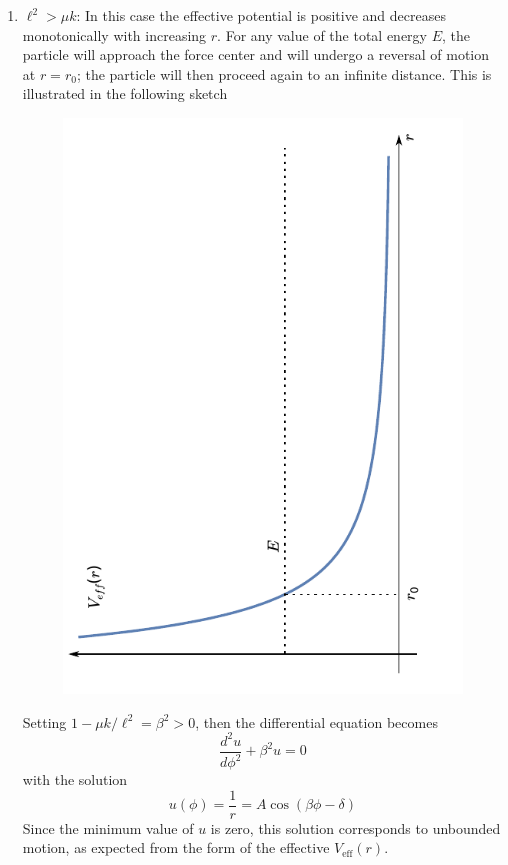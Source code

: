 \documentclass[usletter, 12pt]{article}
\begin{document}
\begin{enumerate}[leftmargin=0em, label=\textbf{\arabic*}.]
\begin{enumerate}[leftmargin=2em, label=(\textbf{\alph*})]
  \item $\ell^2>\mu k$:
    \noindent In this case the effective potential is positive and decreases
    monotonically with increasing $r$. For any value of the total energy $E$, the
    particle will approach the force center and will undergo a reversal of
    motion at $r=r_0$; the particle will then proceed again to an infinite
    distance. This is illustrated in the following sketch
    \begin{figure}[!hbt]
      \centering
      \includegraphics[width=0.7\columnwidth, angle=-90]{effective_potential_1.pdf}
    \end{figure}

    Setting $1-\mu k/\ell^2 = \beta^2 > 0$, then the differential equation
    becomes
    \begin{equation}
      \frac{d^2u}{d\phi^2}+\beta^2u = 0
    \end{equation}
    with the solution
    \begin{equation}
      u(\phi) = \frac{1}{r} = A\cos\left(\beta\phi -\delta\right)
    \end{equation}
    Since the minimum value of $u$ is zero, this solution corresponds to
    unbounded motion, as expected from the form of the effective
    $V_{\text{eff}}(r)$.\\ 


\end{enumerate}
\end{enumerate}
\end{document}
